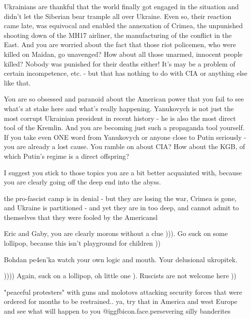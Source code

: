 \begin{itemize}
Ukrainians are thankful that the world finally got engaged in the situation and
didn't let the Siberian bear trample all over Ukraine. Even so, their reaction
came late, was equivocal and enabled the annexation of Crimea, the unpunished
shooting down of the MH17 airliner, the manufacturing of the conflict in the
East. And you are worried about the fact that those riot policemen, who were
killed on Maidan, go unavenged? How about all those unarmed, innocent people
killed? Nobody was punished for their deaths either! It's may be a problem of
certain incompetence, etc. - but that has nothing to do with CIA or anything
else like that.

You are so obsessed and paranoid about the American power that you fail to see
what's at stake here and what's really happening. Yanukovych is not just the
most corrupt Ukrainian president in recent history - he is also the most direct
tool of the Kremlin. And you are becoming just such a propaganda tool yourself.
If you take even ONE word from Yanukovych or anyone close to Putin seriously -
you are already a lost cause. You ramble on about CIA? How about the KGB, of
which Putin's regime is a direct offspring?

I suggest you stick to those topics you are a bit better acquainted with,
because you are clearly going off the deep end into the abyss.

\begin{itemize} %

the pro-fascist camp is in denial - but they are losing the war, Crimea is
gone, and Ukraine is partitioned - and yet they are in too deep, and cannot
admit to themselves that they were fooled by the Americansl


Eric and Gaby, you are clearly morons without a clue ))). Go suck on some lollipop, because this isn't playground for children ))

Bohdan pe4en'ka watch your own logic and mouth. Your delusional ukropitek.

)))) Again, suck on a lollipop, oh little one ). Ruscists are not welcome here ))


"peaceful protesters" with guns and molotovs attacking security forces that
were ordered for months to be restrained.. ya, try that in America and west
Europe and see what will happen to you  @igg{fbicon.face.persevering}  silly banderites


\end{itemize}
\end{itemize}
